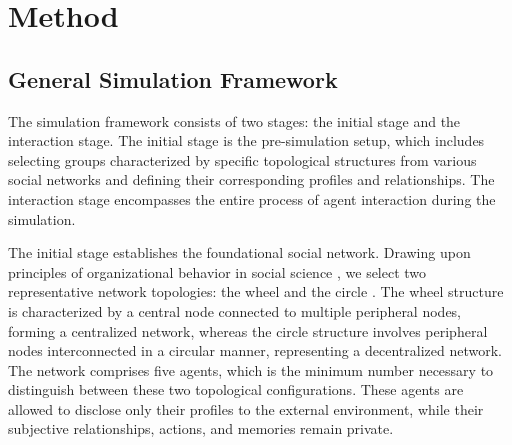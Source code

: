\newcommand{\GetMaxAgent}[1]{...}


\section{Method}




\subsection{General Simulation Framework}

The simulation framework consists of two stages: the initial stage and the interaction stage. The initial stage is the pre-simulation setup, which includes selecting groups characterized by specific topological structures from various social networks and defining their corresponding profiles and relationships. The interaction stage encompasses the entire process of agent interaction during the simulation.


The initial stage establishes the foundational social network. Drawing upon principles of organizational behavior in social science \cite{b50,b46}, we select two representative network topologies: the wheel and the circle \cite{b46}. The wheel structure is characterized by a central node connected to multiple peripheral nodes, forming a centralized network, whereas the circle structure involves peripheral nodes interconnected in a circular manner, representing a decentralized network. The network comprises five agents, which is the minimum number necessary to distinguish between these two topological configurations. These agents are allowed to disclose only their profiles to the external environment, while their subjective relationships, actions, and memories remain private.

